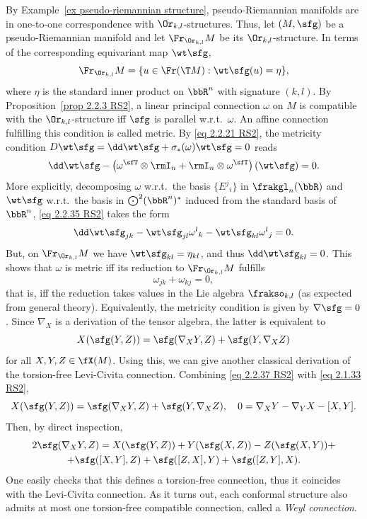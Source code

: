 \begin{example}
    By Example~\ref{ex pseudo-riemannian structure}, pseudo-Riemannian manifolds are in one-to-one correspondence with $\Or_{k,l}$-structures. Thus, let $(M,\sfg)$ be a pseudo-Riemannian manifold and let $\Fr_{\Or_{k,l}} M$ be its $\Or_{k,l}$-structure. In terms of the corresponding equivariant map $\wt\sfg$, 
    \[\Fr_{\Or_{k,l}}M=\{u \in\Fr(\T M):\wt\sfg(u)=\eta\},\]
    where $\eta$ is the standard inner product on $\bbR^n$ with signature $(k,l)$. By Proposition~\ref{prop 2.2.3 RS2}, a linear principal connection $\omega$ on $M$ is compatible with the $\Or_{k,l}$-structure iff $\sfg$ is parallel w.r.t.\ $\omega$. An affine connection fulfilling this condition is called metric. By \eqref{eq 2.2.21 RS2}, the metricity condition $D\wt\sfg=\dd\wt\sfg+\sigma_\ast(\omega)\wt\sfg=0$ reads 
    \[\dd\wt\sfg-\left(\omega^\sfT \otimes \rmI_n+\rmI_n\otimes \omega^\sfT \right)(\wt\sfg)=0.\label{eq 2.2.35 RS2}\]
    More explicitly, decomposing $\omega$ w.r.t.\ the basis $\{E^j{}_i\}$ in $\frakgl_n(\bbR)$ and $\wt\sfg$ w.r.t.\ the basis in $\bigodot\nolimits^2(\bbR^n)^\ast$ induced from the standard basis of $\bbR^n$, \eqref{eq 2.2.35 RS2} takes the form 
    \[\dd \wt\sfg_{jk}-\wt\sfg_{jl}\omega^l{}_k-\wt\sfg_{kl}\omega^l{}_j=0.\]
    But, on $\Fr_{\Or_{k,l}} M$ we have $\wt\sfg_{kl}=\eta_{kl}$, and thus $\dd\wt\sfg_{kl}=0$. This shows that $\omega$ is metric iff its reduction to $\Fr_{\Or_{k,l}}M$ fulfills 
    \[\omega_{jk}+\omega_{kj}=0,\]
    that is, iff the reduction takes values in the Lie algebra $\frakso_{k,l}$ (as expected from general theory). Equivalently, the metricity condition is given by $\nabla\sfg=0$. Since $\nabla_X$ is a derivation of the tensor algebra, the latter is equivalent to 
    \[X(\sfg(Y,Z))=\sfg(\nabla_X Y,Z)+\sfg(Y,\nabla_X Z)\label{eq 2.2.37 RS2}\]
    for all $X,Y,Z\in\fX(M)$. Using this, we can give another classical derivation of the torsion-free Levi-Civita connection. Combining \eqref{eq 2.2.37 RS2} with \eqref{eq 2.1.33 RS2}, 
    \[X(\sfg(Y,Z))=\sfg(\nabla_X Y,Z)+\sfg(Y,\nabla_X Z),\quad 0=\nabla_X Y-\nabla_Y X-[X,Y].\]
    Then, by direct inspection,
    \begin{multline}
        2\sfg(\nabla_X Y,Z)=X(\sfg(Y,Z))+Y(\sfg(X,Z))-Z(\sfg(X,Y))+\\
        +\sfg([X,Y],Z)+\sfg([Z,X],Y)+\sfg([Z,Y],X).\label{eq 2.2.40 RS2}
    \end{multline}
    One easily checks that this defines a torsion-free connection, thus it coincides with the Levi-Civita connection.  As it turns out, each conformal structure also admits at most one torsion-free compatible connection, called a \emph{Weyl connection}.
\end{example}


